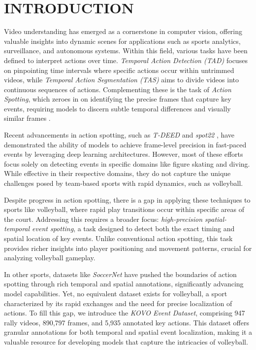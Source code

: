 \documentclass[a4paper,twoside]{article}
\begin{document}
\section{\uppercase{Introduction}}
\label{sec:introduction}
Video understanding has emerged as a cornerstone in computer vision, offering valuable insights into dynamic scenes for applications such as sports analytics, surveillance, and autonomous systems. Within this field, various tasks have been defined to interpret actions over time. \textit{Temporal Action Detection (TAD)} focuses on pinpointing time intervals where specific actions occur within untrimmed videos, while \textit{Temporal Action Segmentation (TAS)} aims to divide videos into continuous sequences of actions. Complementing these is the task of \textit{Action Spotting}, which zeroes in on identifying the precise frames that capture key events, requiring models to discern subtle temporal differences and visually similar frames \cite{spot22}.

Recent advancements in action spotting, such as \textit{T-DEED} \cite{teed23} and \textit{spot22} \cite{spot22}, have demonstrated the ability of models to achieve frame-level precision in fast-paced events by leveraging deep learning architectures. However, most of these efforts focus solely on detecting events in specific domains like figure skating and diving. While effective in their respective domains, they do not capture the unique challenges posed by team-based sports with rapid dynamics, such as volleyball.

Despite progress in action spotting, there is a gap in applying these techniques to sports like volleyball, where rapid play transitions occur within specific areas of the court. Addressing this requires a broader focus: \textit{high-precision spatial-temporal event spotting}, a task designed to detect both the exact timing and spatial location of key events. Unlike conventional action spotting, this task provides richer insights into player positioning and movement patterns, crucial for analyzing volleyball gameplay.

In other sports, datasets like \textit{SoccerNet} have pushed the boundaries of action spotting through rich temporal and spatial annotations, significantly advancing model capabilities. Yet, no equivalent dataset exists for volleyball, a sport characterized by its rapid exchanges and the need for precise localization of actions. To fill this gap, we introduce the \textit{KOVO Event Dataset}, comprising 947 rally videos, 890,797 frames, and 5,935 annotated key actions. This dataset offers granular annotations for both temporal and spatial event localization, making it a valuable resource for developing models that capture the intricacies of volleyball.
\end{document}

